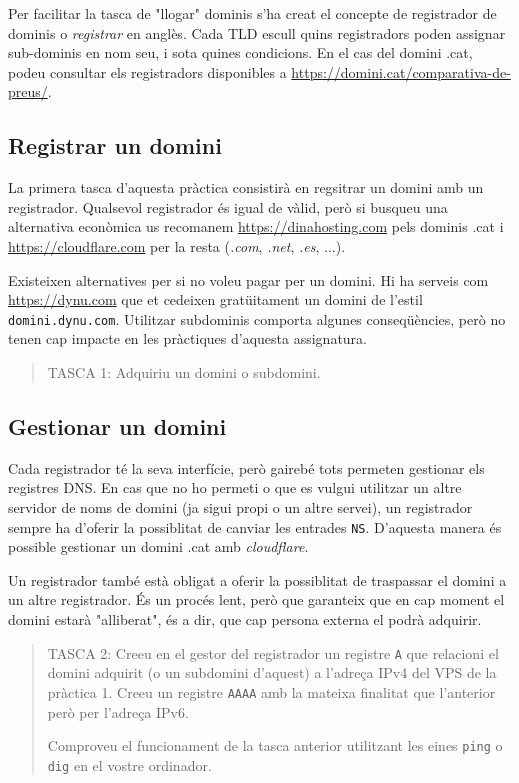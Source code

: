 \documentclass{practicaitic}
\begin{document}
Per facilitar la tasca de "llogar" dominis s'ha creat el concepte de
registrador de dominis o \textit{registrar} en anglès. Cada TLD escull quins
registradors poden assignar sub-dominis en nom seu, i sota quines condicions.
En el cas del domini .cat, podeu consultar els registradors disponibles a
\url{https://domini.cat/comparativa-de-preus/}.

\subsection{Registrar un domini}

La primera tasca d'aquesta pràctica consistirà en regsitrar un domini
amb un registrador. Qualsevol registrador és igual de vàlid, però si busqueu
una alternativa econòmica us recomanem \url{https://dinahosting.com} pels
dominis .cat i \url{https://cloudflare.com} per la resta (\textit{.com}, \textit{.net}, \textit{.es}, ...).

Existeixen alternatives per si no voleu pagar per un domini. Hi ha serveis com
\url{https://dynu.com} que et cedeixen gratüitament un domini de l'estil
\texttt{domini.dynu.com}. Utilitzar subdominis comporta algunes conseqüències,
però no tenen cap impacte en les pràctiques d'aquesta assignatura.

\begin{quote}
  TASCA 1: Adquiriu un domini o subdomini.
\end{quote}

\subsection{Gestionar un domini}

Cada registrador té la seva interfície, però gairebé tots permeten gestionar
els registres DNS. En cas que no ho permeti o que es vulgui utilitzar un altre
servidor de noms de domini (ja sigui propi o un altre servei), un registrador
sempre ha d'oferir la possiblitat de canviar les entrades \texttt{NS}. D'aquesta
manera és possible gestionar un domini .cat amb \textit{cloudflare}.

Un registrador també està obligat a oferir la possiblitat de traspassar el domini
a un altre registrador. És un procés lent, però que garanteix que en cap moment el
domini estarà "alliberat", és a dir, que cap persona externa el podrà adquirir.

\begin{quote}
  TASCA 2: Creeu en el gestor del registrador un registre \texttt{A} que relacioni
  el domini adquirit (o un subdomini d'aquest) a l'adreça IPv4 del VPS de la
  pràctica 1. Creeu un registre \texttt{AAAA} amb la mateixa finalitat que l'anterior
  però per l'adreça IPv6.

  Comproveu el funcionament de la tasca anterior utilitzant les eines \texttt{ping}
  o \texttt{dig} en el vostre ordinador.
\end{quote}
\end{document}
